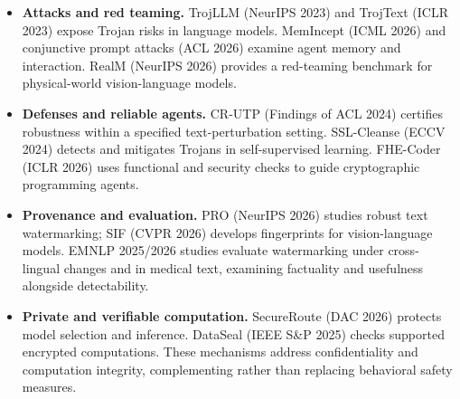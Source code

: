\begin{itemize}
\item \textbf{Attacks and red teaming.} TrojLLM (NeurIPS 2023) and TrojText (ICLR 2023) expose Trojan risks in language models. MemIncept (ICML 2026) and conjunctive prompt attacks (ACL 2026) examine agent memory and interaction. RealM (NeurIPS 2026) provides a red-teaming benchmark for physical-world vision-language models.
\item \textbf{Defenses and reliable agents.} CR-UTP (Findings of ACL 2024) certifies robustness within a specified text-perturbation setting. SSL-Cleanse (ECCV 2024) detects and mitigates Trojans in self-supervised learning. FHE-Coder (ICLR 2026) uses functional and security checks to guide cryptographic programming agents.
\item \textbf{Provenance and evaluation.} PRO (NeurIPS 2026) studies robust text watermarking; SIF (CVPR 2026) develops fingerprints for vision-language models. EMNLP 2025/2026 studies evaluate watermarking under cross-lingual changes and in medical text, examining factuality and usefulness alongside detectability.
\item \textbf{Private and verifiable computation.} SecureRoute (DAC 2026) protects model selection and inference. DataSeal (IEEE S\&P 2025) checks supported encrypted computations. These mechanisms address confidentiality and computation integrity, complementing rather than replacing behavioral safety measures.
\end{itemize}
